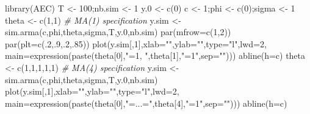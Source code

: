 \documentclass[
  12pt,
]{book}
\newenvironment{Shaded}{\begin{snugshade}}{\end{snugshade}}
\newcommand{\AttributeTok}[1]{\textcolor[rgb]{0.77,0.63,0.00}{#1}}
\newcommand{\CommentTok}[1]{\textcolor[rgb]{0.56,0.35,0.01}{\textit{#1}}}
\newcommand{\DecValTok}[1]{\textcolor[rgb]{0.00,0.00,0.81}{#1}}
\newcommand{\FloatTok}[1]{\textcolor[rgb]{0.00,0.00,0.81}{#1}}
\newcommand{\FunctionTok}[1]{\textcolor[rgb]{0.00,0.00,0.00}{#1}}
\newcommand{\NormalTok}[1]{#1}
\newcommand{\OtherTok}[1]{\textcolor[rgb]{0.56,0.35,0.01}{#1}}
\newcommand{\StringTok}[1]{\textcolor[rgb]{0.31,0.60,0.02}{#1}}
\theoremstyle{definition}
\theoremstyle{definition}
\theoremstyle{definition}
\theoremstyle{definition}
\theoremstyle{remark}
\begin{document}
\begin{Shaded}
\begin{Highlighting}[]
\FunctionTok{library}\NormalTok{(AEC)}
\NormalTok{T }\OtherTok{\textless{}{-}} \DecValTok{100}\NormalTok{;nb.sim }\OtherTok{\textless{}{-}} \DecValTok{1}
\NormalTok{y}\FloatTok{.0} \OtherTok{\textless{}{-}} \FunctionTok{c}\NormalTok{(}\DecValTok{0}\NormalTok{)}
\NormalTok{c }\OtherTok{\textless{}{-}} \DecValTok{1}\NormalTok{;phi }\OtherTok{\textless{}{-}} \FunctionTok{c}\NormalTok{(}\DecValTok{0}\NormalTok{);sigma }\OtherTok{\textless{}{-}} \DecValTok{1}
\NormalTok{theta }\OtherTok{\textless{}{-}} \FunctionTok{c}\NormalTok{(}\DecValTok{1}\NormalTok{,}\DecValTok{1}\NormalTok{) }\CommentTok{\# MA(1) specification}
\NormalTok{y.sim }\OtherTok{\textless{}{-}} \FunctionTok{sim.arma}\NormalTok{(c,phi,theta,sigma,T,y}\FloatTok{.0}\NormalTok{,nb.sim)}
\FunctionTok{par}\NormalTok{(}\AttributeTok{mfrow=}\FunctionTok{c}\NormalTok{(}\DecValTok{1}\NormalTok{,}\DecValTok{2}\NormalTok{))}
\FunctionTok{par}\NormalTok{(}\AttributeTok{plt=}\FunctionTok{c}\NormalTok{(.}\DecValTok{2}\NormalTok{,.}\DecValTok{9}\NormalTok{,.}\DecValTok{2}\NormalTok{,.}\DecValTok{85}\NormalTok{))}
\FunctionTok{plot}\NormalTok{(y.sim[,}\DecValTok{1}\NormalTok{],}\AttributeTok{xlab=}\StringTok{""}\NormalTok{,}\AttributeTok{ylab=}\StringTok{""}\NormalTok{,}\AttributeTok{type=}\StringTok{"l"}\NormalTok{,}\AttributeTok{lwd=}\DecValTok{2}\NormalTok{,}
     \AttributeTok{main=}\FunctionTok{expression}\NormalTok{(}\FunctionTok{paste}\NormalTok{(theta[}\DecValTok{0}\NormalTok{],}\StringTok{"=1, "}\NormalTok{,theta[}\DecValTok{1}\NormalTok{],}\StringTok{"=1"}\NormalTok{,}\AttributeTok{sep=}\StringTok{""}\NormalTok{)))}
\FunctionTok{abline}\NormalTok{(}\AttributeTok{h=}\NormalTok{c)}
\NormalTok{theta }\OtherTok{\textless{}{-}} \FunctionTok{c}\NormalTok{(}\DecValTok{1}\NormalTok{,}\DecValTok{1}\NormalTok{,}\DecValTok{1}\NormalTok{,}\DecValTok{1}\NormalTok{,}\DecValTok{1}\NormalTok{) }\CommentTok{\# MA(4) specification}
\NormalTok{y.sim }\OtherTok{\textless{}{-}} \FunctionTok{sim.arma}\NormalTok{(c,phi,theta,sigma,T,y}\FloatTok{.0}\NormalTok{,nb.sim)}
\FunctionTok{plot}\NormalTok{(y.sim[,}\DecValTok{1}\NormalTok{],}\AttributeTok{xlab=}\StringTok{""}\NormalTok{,}\AttributeTok{ylab=}\StringTok{""}\NormalTok{,}\AttributeTok{type=}\StringTok{"l"}\NormalTok{,}\AttributeTok{lwd=}\DecValTok{2}\NormalTok{,}
     \AttributeTok{main=}\FunctionTok{expression}\NormalTok{(}\FunctionTok{paste}\NormalTok{(theta[}\DecValTok{0}\NormalTok{],}\StringTok{"=...="}\NormalTok{,theta[}\DecValTok{4}\NormalTok{],}\StringTok{"=1"}\NormalTok{,}\AttributeTok{sep=}\StringTok{""}\NormalTok{)))}
\FunctionTok{abline}\NormalTok{(}\AttributeTok{h=}\NormalTok{c)}
\end{Highlighting}
\end{Shaded}
\end{document}

